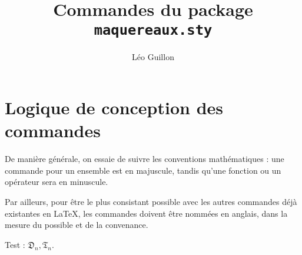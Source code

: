 \documentclass[print]{atomathematyk}
\title{Commandes du package \texttt{maquereaux.sty}}
\author{Léo Guillon}
\date{}
\begin{document}
\maketitle

\section{Logique de conception des commandes}

De manière générale, on essaie de suivre les conventions mathématiques : une commande pour un ensemble est en majuscule, tandis qu’une fonction ou un opérateur sera en minuscule.

Par ailleurs, pour être le plus consistant possible avec les autres commandes déjà existantes en \LaTeX, les commandes doivent être nommées en anglais, dans la mesure du possible et de la convenance.

Test : \(\mathfrak{D}_n, \mathfrak{T}_n.\)
\end{document}
